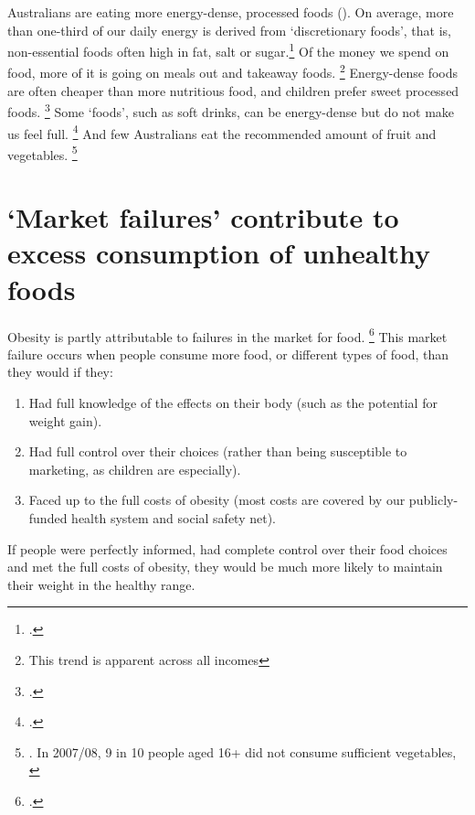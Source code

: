 \documentclass[embargoed]{grattan}
\begin{document}
Australians are eating more energy-dense, processed foods ().
On average, more than one-third of our daily energy is derived from `discretionary foods', that is, non-essential foods often high in fat, salt or sugar.\footcites{ABS20144364055007AustralianHealth}{Hendrie2016CSIROHealthyDiet} Of the money we spend on food, more of it is going on meals out and takeaway foods.%
\footnote{This trend is apparent across all incomes} Energy-dense foods are often cheaper than more nutritious food, and children prefer sweet processed foods.%
\footcite{Roberto2015Patchyprogressobesity} Some `foods', such as soft drinks, can be energy-dense but do not make us feel full.%
\footcites{Mozaffarian2016politicssciencesoda}{Fletcher2011Aresoftdrink}{Malik2006Intakesugarsweetened}{Ruyter2012trialsugarfree}{Johnson2009Dietarysugarsintake} And few Australians eat the recommended amount of fruit and vegetables.%
\footnote{\textcite{Hendrie2016CSIROHealthyDiet}.
In 2007/08, 9 in 10 people aged 16+ did not consume sufficient vegetables, \textcite{Health2012Australiasfood}}

\clearpage
\section{`Market failures’ contribute to excess consumption of unhealthy foods }\label{many-of-the-factors-contributing-to-excess-energy-in-are-market-failures}

Obesity is partly attributable to failures in the market for food.%
\footcite{Karnani2016ObesityCrisisas} This market failure occurs when people consume more food, or different types of food, than they would if they:

\begin{enumerate}
 \item Had full knowledge of the effects on their body (such as the potential for weight gain). 
 \item Had full control over their choices (rather than being susceptible to marketing, as children are especially). 
 \item Faced up to the full costs of obesity (most costs are covered by our publicly-funded health system and social safety net).
\end{enumerate}

If people were perfectly informed, had complete control over their food choices and met the full costs of obesity, they would be much more likely to maintain their weight in the healthy range.
\end{document}
